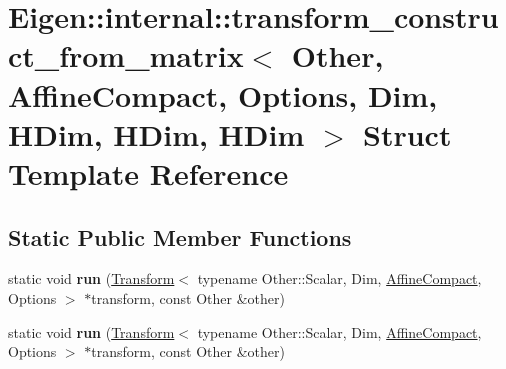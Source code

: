 \hypertarget{struct_eigen_1_1internal_1_1transform__construct__from__matrix_3_01_other_00_01_affine_compact_0db5fc8047dca3fa661370cba4245d7ad}{}\section{Eigen\+:\+:internal\+:\+:transform\+\_\+construct\+\_\+from\+\_\+matrix$<$ Other, Affine\+Compact, Options, Dim, H\+Dim, H\+Dim, H\+Dim $>$ Struct Template Reference}
\label{struct_eigen_1_1internal_1_1transform__construct__from__matrix_3_01_other_00_01_affine_compact_0db5fc8047dca3fa661370cba4245d7ad}
\subsection*{Static Public Member Functions}
\begin{DoxyCompactItemize}
\item 
\mbox{\label{struct_eigen_1_1internal_1_1transform__construct__from__matrix_3_01_other_00_01_affine_compact_0db5fc8047dca3fa661370cba4245d7ad_a804f671b45dd7794fa2c33b5f0e25040}} 
static void {\bfseries run} (\hyperlink{group___geometry___module_class_eigen_1_1_transform}{Transform}$<$ typename Other\+::\+Scalar, Dim, \hyperlink{group__enums_ggaee59a86102f150923b0cac6d4ff05107aa30a06b60d218b709020972df47de2b0}{Affine\+Compact}, Options $>$ $\ast$transform, const Other \&other)
\item 
\mbox{\label{struct_eigen_1_1internal_1_1transform__construct__from__matrix_3_01_other_00_01_affine_compact_0db5fc8047dca3fa661370cba4245d7ad_a804f671b45dd7794fa2c33b5f0e25040}} 
static void {\bfseries run} (\hyperlink{group___geometry___module_class_eigen_1_1_transform}{Transform}$<$ typename Other\+::\+Scalar, Dim, \hyperlink{group__enums_ggaee59a86102f150923b0cac6d4ff05107aa30a06b60d218b709020972df47de2b0}{Affine\+Compact}, Options $>$ $\ast$transform, const Other \&other)
\end{DoxyCompactItemize}


